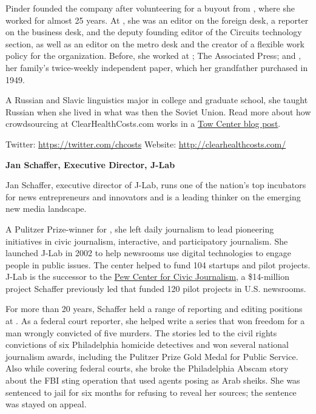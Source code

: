 \begin{itemize}
Pinder founded the company after volunteering for a buyout from , where she worked for almost 25 years. At , she was an editor on the foreign desk, a reporter on the business desk, and the deputy founding editor of the Circuits technology section, as well as an editor on the metro desk and the creator of a flexible work policy for the organization. Before, she worked at ; The Associated Press; and , her family’s twice-weekly independent paper, which her grandfather purchased in 1949.

A Russian and Slavic linguistics major in college and graduate school, she taught Russian when she lived in what was then the Soviet Union. Read more about how crowdsourcing at ClearHealthCosts.com works in a \href{http://towcenter.org/crowdsourcing-in-theory-and-practice}{Tow Center blog post}.\autocite{Towblog}   

Twitter: \href{https://twitter.com/chcosts}{https://twitter.com/chcosts}
Website: \href{http://clearhealthcosts.com/}{http://clearhealthcosts.com/}


\textbf{Jan Schaffer, Executive Director, J-Lab}

Jan Schaffer, executive director of J-Lab, runs one of the nation’s top incubators for news entrepreneurs and innovators and is a leading thinker on the emerging new media landscape.

A Pulitzer Prize-winner for , she left daily journalism to lead pioneering initiatives in civic journalism, interactive, and participatory journalism. She launched J-Lab in 2002 to help newsrooms use digital technologies to engage people in public issues. The center helped to fund 104 startups and pilot projects. J-Lab is the successor to the \href{http://pewcenter.org/}{Pew Center for Civic Journalism}, a \$14-million project Schaffer previously led that funded 120 pilot projects in U.S. newsrooms. 

For more than 20 years, Schaffer held a range of reporting and editing positions at . As a federal court reporter, she helped write a series that won freedom for a man wrongly convicted of five murders. The stories led to the civil rights convictions of six Philadelphia homicide detectives and won several national journalism awards, including the Pulitzer Prize Gold Medal for Public Service. Also while covering federal courts, she broke the Philadelphia Abscam story about the FBI sting operation that used agents posing as Arab sheiks. She was sentenced to jail for six months for refusing to reveal her sources; the sentence was stayed on appeal.


\end{itemize}
